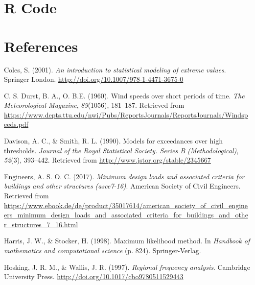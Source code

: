 \documentclass[12pt,oneside]{reedthesis}
\begin{document}
\appendix

\hypertarget{r-code}{%
\chapter{R Code}\label{r-code}}

\backmatter

\hypertarget{references}{%
\chapter*{References}\label{references}}


\noindent

\setlength{\parindent}{-0.20in}
\setlength{\leftskip}{0.20in}
\setlength{\parskip}{8pt}

\hypertarget{refs}{}
\leavevmode\hypertarget{ref-Coles2001}{}%
Coles, S. (2001). \emph{An introduction to statistical modeling of extreme values}. Springer London. \url{http://doi.org/10.1007/978-1-4471-3675-0}

\leavevmode\hypertarget{ref-Durst1960}{}%
C. S. Durst, B. A., O. B.E. (1960). Wind speeds over short periods of time. \emph{The Meteorological Magazine}, \emph{89}(1056), 181--187. Retrieved from \url{https://www.depts.ttu.edu/nwi/Pubs/ReportsJournals/ReportsJournals/Windspeeds.pdf}

\leavevmode\hypertarget{ref-Davison1990}{}%
Davison, A. C., \& Smith, R. L. (1990). Models for exceedances over high thresholds. \emph{Journal of the Royal Statistical Society. Series B (Methodological)}, \emph{52}(3), 393--442. Retrieved from \url{http://www.jstor.org/stable/2345667}

\leavevmode\hypertarget{ref-Asce2017}{}%
Engineers, A. S. O. C. (2017). \emph{Minimum design loads and associated criteria for buildings and other structures (asce7-16)}. American Society of Civil Engineers. Retrieved from \url{https://www.ebook.de/de/product/35017614/american_society_of_civil_engineers_minimum_design_loads_and_associated_criteria_for_buildings_and_other_structures_7_16.html}

\leavevmode\hypertarget{ref-Harris1994}{}%
Harris, J. W., \& Stocker, H. (1998). Maximum likelihood method. In \emph{Handbook of mathematics and computational science} (p. 824). Springer-Verlag.

\leavevmode\hypertarget{ref-Hosking1997}{}%
Hosking, J. R. M., \& Wallis, J. R. (1997). \emph{Regional frequency analysis}. Cambridge University Press. \url{http://doi.org/10.1017/cbo9780511529443}
\end{document}
